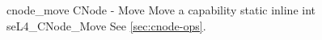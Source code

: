 %
%
%
%

\apidoc
{cnode_move}
{CNode - Move}
{Move a capability}
{static inline int seL4\_CNode\_Move }
{
}
{\errorenumdesc}
{See \autoref{sec:cnode-ops}.}

